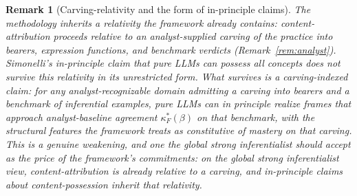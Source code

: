 \documentclass[11pt]{article}
\newtheorem{remark}{Remark}
\begin{document}

\begin{remark}[Carving-relativity and the form of in-principle claims]
\label{rem:operational}
The methodology inherits a relativity the framework already contains: content-attribution proceeds relative to an analyst-supplied carving of the practice into bearers, expression functions, and benchmark verdicts (Remark~\ref{rem:analyst}). Simonelli's in-principle claim that pure LLMs can possess all concepts \cite{simonelli2026} does not survive this relativity in its unrestricted form. What survives is a carving-indexed claim: for any analyst-recognizable domain admitting a carving into bearers and a benchmark of inferential examples, pure LLMs can in principle realize frames that approach analyst-baseline agreement $\kappa^*_F(\beta)$ on that benchmark, with the structural features the framework treats as constitutive of mastery on that carving. This is a genuine weakening, and one the global strong inferentialist should accept as the price of the framework's commitments: on the global strong inferentialist view, content-attribution is already relative to a carving, and in-principle claims about content-possession inherit that relativity.
\end{remark}
\end{document}
